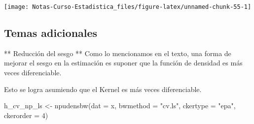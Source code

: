 \documentclass[
  12pt,
]{book}
\newenvironment{Shaded}{\begin{snugshade}}{\end{snugshade}}
\newcommand{\AttributeTok}[1]{\textcolor[rgb]{0.77,0.63,0.00}{#1}}
\newcommand{\DecValTok}[1]{\textcolor[rgb]{0.00,0.00,0.81}{#1}}
\newcommand{\FunctionTok}[1]{\textcolor[rgb]{0.00,0.00,0.00}{#1}}
\newcommand{\NormalTok}[1]{#1}
\newcommand{\OtherTok}[1]{\textcolor[rgb]{0.56,0.35,0.01}{#1}}
\newcommand{\SpecialCharTok}[1]{\textcolor[rgb]{0.00,0.00,0.00}{#1}}
\newcommand{\StringTok}[1]{\textcolor[rgb]{0.31,0.60,0.02}{#1}}
\theoremstyle{definition}
\theoremstyle{definition}
\theoremstyle{definition}
\theoremstyle{definition}
\theoremstyle{remark}
\begin{document}
\begin{Shaded}
\end{Shaded}

\begin{center}\texttt{[image: Notas-Curso-Estadistica\_files/figure-latex/unnamed-chunk-55-1]} \end{center}

\hypertarget{temas-adicionales}{%
\subsection{Temas adicionales}\label{temas-adicionales}}

** Reducción del sesgo ** Como lo mencionamos en el texto, una forma
de mejorar el sesgo en la estimación es suponer que la función de
densidad es más veces diferenciable.

Esto se logra asumiendo que el Kernel es más veces diferenciable.

\begin{Shaded}
\begin{Highlighting}[]
\NormalTok{h\_cv\_np\_ls }\OtherTok{\textless{}{-}} \FunctionTok{npudensbw}\NormalTok{(}\AttributeTok{dat =}\NormalTok{ x, }\AttributeTok{bwmethod =} \StringTok{"cv.ls"}\NormalTok{,}
    \AttributeTok{ckertype =} \StringTok{"epa"}\NormalTok{, }\AttributeTok{ckerorder =} \DecValTok{4}\NormalTok{)}
\end{Highlighting}
\end{Shaded}
\end{document}

